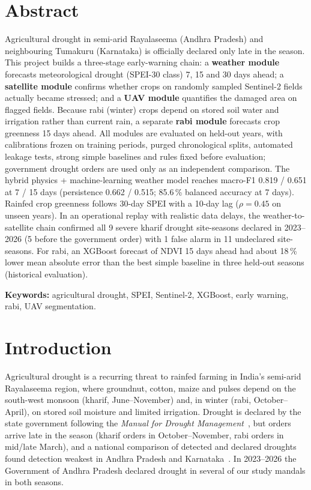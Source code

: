 \documentclass[11pt,a4paper,oneside]{article}
\newcommand{\mf}{macro-F1}
\begin{document}
\section*{Abstract}
Agricultural drought in semi-arid Rayalaseema (Andhra Pradesh) and neighbouring Tumakuru (Karnataka) is officially declared only late in the season. This project builds a three-stage early-warning chain: a \textbf{weather module} forecasts meteorological drought (SPEI-30 class) 7, 15 and 30 days ahead; a \textbf{satellite module} confirms whether crops on randomly sampled Sentinel-2 fields actually became stressed; and a \textbf{UAV module} quantifies the damaged area on flagged fields. Because rabi (winter) crops depend on stored soil water and irrigation rather than current rain, a separate \textbf{rabi module} forecasts crop greenness 15 days ahead.
All modules are evaluated on held-out years, with calibrations frozen on training periods, purged chronological splits, automated leakage tests, strong simple baselines and rules fixed before evaluation; government drought orders are used only as an independent comparison.
The hybrid physics + machine-learning weather model reaches \mf{} 0.819 / 0.651 at 7 / 15 days (persistence 0.662 / 0.515; 85.6\,\% balanced accuracy at 7 days). Rainfed crop greenness follows 30-day SPEI with a 10-day lag ($\rho = 0.45$ on unseen years). In an operational replay with realistic data delays, the weather-to-satellite chain confirmed all 9 severe kharif drought site-seasons declared in 2023--2026 (5 before the government order) with 1 false alarm in 11 undeclared site-seasons. For rabi, an XGBoost forecast of NDVI 15 days ahead had about 18\,\% lower mean absolute error than the best simple baseline in three held-out seasons (historical evaluation).

\vspace{4pt}
\textbf{Keywords:} agricultural drought, SPEI, Sentinel-2, XGBoost, early warning, rabi, UAV segmentation.

\section{Introduction}

Agricultural drought is a recurring threat to rainfed farming in India's semi-arid Rayalaseema region, where groundnut, cotton, maize and pulses depend on the south-west monsoon (kharif, June--November) and, in winter (rabi, October--April), on stored soil moisture and limited irrigation. Drought is declared by the state government following the \textit{Manual for Drought Management}~\cite{manual2016}, but orders arrive late in the season (kharif orders in October--November, rabi orders in mid/late March), and a national comparison of detected and declared droughts found detection weakest in Andhra Pradesh and Karnataka~\cite{bhardwaj2021}. In 2023--2026 the Government of Andhra Pradesh declared drought in several of our study mandals in both seasons.
\end{document}
